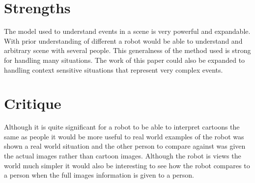 \documentclass{article}
\begin{document}
\section*{Strengths}
The model used to understand events in a scene is very powerful and expandable. With prior understanding of different a robot would be able to understand and arbitrary scene with several people. This generalness of the method used is strong for handling many situations. The work of this paper could also be expanded to handling context sensitive situations that represent very complex events.
\section*{Critique}
Although it is quite significant for a robot to be able to interpret cartoons the same as people it would be more useful to real world examples of the robot was shown a real world situation and the other person to compare against was given the actual images rather than cartoon images. Although the robot is views the world much simpler it would also be interesting to see how the robot compares to a person when the full images information is given to a person.
\cite{4354065}
\end{document}
